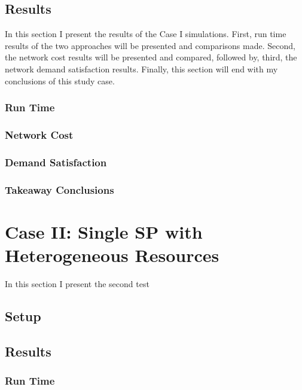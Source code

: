 \documentclass[12pt,dvipsnames]{report}
\begin{document}
\subsection{Results} \label{subsec:caseI_results}

In this section I present the results of the Case I simulations.  First, run time results of the two approaches will be presented and comparisons made.  Second, the network cost results will be presented and compared, followed by, third, the network demand satisfaction results.  Finally, this section will end with my conclusions of this study case.

\subsubsection{Run Time}

\subsubsection{Network Cost}

\subsubsection{Demand Satisfaction}

\subsubsection{Takeaway Conclusions}

\section{Case II: Single SP with Heterogeneous Resources} \label{sec:caseII}

In this section I present the second test

\subsection{Setup} \label{subsec:caseII_setup}

\subsection{Results} \label{subsec:caseII_results}

\subsubsection{Run Time}
\end{document}
